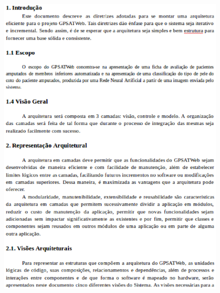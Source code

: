 \begin{apendicesenv}
\begin{figure}[H]
	\end{figure}
	\newpage
	\begin{figure}[H]
		    \label{fig28}
		        \includegraphics[keepaspectratio=true, scale=1]{editaveis/images/arqpag3.eps}
	\end{figure}
	\newpage
	\begin{figure}[H]
		    \label{fig29}

\end{figure}
\end{apendicesenv}
